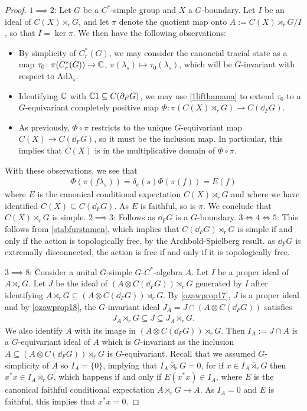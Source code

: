 \begin{proof}
	$1 \implies 2$: Let $G$ be a $C^*$-simple group and $X$ a $G$-boundary. Let $I$ be an ideal of $C(X) \rtimes_r G$, and let $\pi$ denote the quotient map onto $A:= C(X) \rtimes_r G /I$, so that $I = \ker \pi$. We then have the following observations:
	\begin{itemize}
		\item By simplicity of $C_r^*(G)$, we may consider the canoncial tracial state as a map $\tau_0 \colon \pi(C^*_r(G)) \to \mathbb{C}$, $\pi(\lambda_s) \mapsto \tau_0(\lambda_s)$, which will be $G$-invariant with respect to $\mathrm{Ad} \lambda_s$.
		\item Identifying $\mathbb{C}$ with $\mathbb{C} 1 \subseteq C(\partial_F G)$, we may use \cref{1lifthamana} to extend $\tau_0$ to a $G$-equivariant completely positive map $\Phi \colon \pi(C(X) \rtimes_r G) \to C(\dd_F G)$.
		\item As previously, $\Phi \circ \pi$ restricts to the unique $G$-equivariant map $C(X) \to C(\dd_F G)$, so it must be the inclusion map. In particular, this implies that $C(X)$ is in the multiplicative domain of $\Phi \circ \pi$.
	\end{itemize}
	With these observations, we see that
	\begin{align*}
		\Phi (\pi(f \lambda_s)) = \delta_{e}(s) \Phi(\pi(f)) = E(f)	
	\end{align*}
	where $E$ is the canonical conditional expectation $C(X) \rtimes_r G$ and where we have identified $C(X) \subseteq C(\dd_F G)$. As $E$ is faithful, so is $\pi$. We conclude that $C(X) \rtimes_r G$ is simple.
	$2 \implies 3$: Follows as $\dd_F G$ is a $G$-boundary.
	$3 \iff 4 \iff 5$: This follows from \cref{stabfurstamen}, which implies that $C(\dd_F G) \rtimes_r G$ is simple if and only if the action is topologically free, by the Archbold-Spielberg result. as $\dd_F G$ is extremally disconnected, the action is free if and only if it is topologically free.

	$3 \implies 8$: Consider a unital $G$-simple $G$-$C^*$-algebra $A$. Let $I$ be a proper ideal of $A \rtimes_r G$. Let $J$ be the ideal of $(A \otimes C(\dd_F G)) \rtimes_r G$ generated by $I$ after identifying $A \rtimes_r G \subseteq (A \otimes C(\dd_F G) ) \rtimes_r G$. By \cref{ozawprop17}, $J$ is a proper ideal and by \cref{ozawprop18}, the $G$-invariant ideal $J_A = J \cap (A \otimes C(\dd_F G))$ satisfies
	\begin{align*}
		J_A \rtimes_r G \subseteq J \subseteq J_A \bar \rtimes_r G.
	\end{align*}
	We also identify $A$ with its image in $(A \otimes C(\dd_F G)) \rtimes_r G$. Then $I_A := J \cap A$ is a $G$-equivariant ideal of $A$ which is $G$-invariant as the inclusion $A \subseteq (A \otimes C(\dd_F G)) \rtimes_r G$ is $G$-equivariant. Recall that we assumed $G$-simplicity of $A$ so $I_A = \{0\}$, implying that $I_A \bar \rtimes_r G = 0$, for if $x \in I_A \bar \rtimes_r G$ then $x^*x \in I_A \bar \rtimes_r G$, which happens if and only if $E(x^*x) \in I_A$, where $E$ is the canonical faithful conditional expectation $A \rtimes_r G \to A$. As $I_A = 0$ and $E$ is faithful, this implies that $x^*x = 0$. 


\end{proof}
